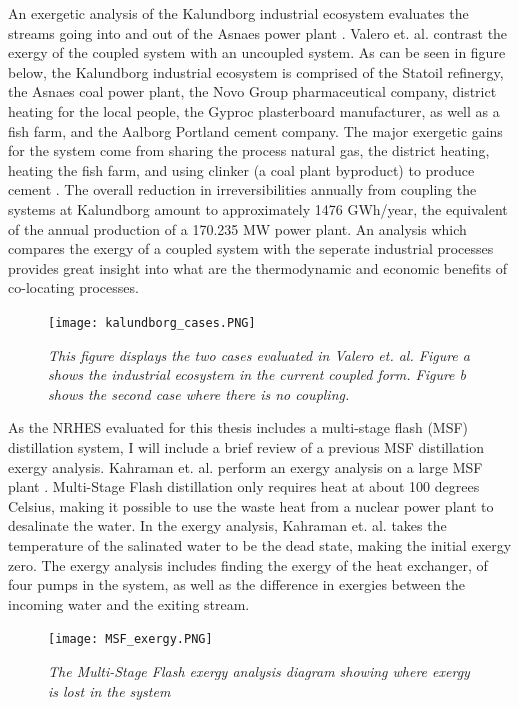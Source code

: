 \documentclass[12pt]{UIdahoMastersThesis}
\begin{document}
 An exergetic analysis of the Kalundborg industrial ecosystem evaluates the streams going into and out of the Asnaes power plant \cite{Valero2012}.  Valero et. al. contrast the exergy of the coupled system with an uncoupled system. As can be seen in figure below, the Kalundborg industrial ecosystem is comprised of the Statoil refinergy, the Asnaes coal power plant, the Novo Group pharmaceutical company, district heating for the local people, the Gyproc plasterboard manufacturer, as well as a fish farm, and  the Aalborg Portland cement company. The major exergetic gains for the system come from sharing the process natural gas, the district heating, heating the fish farm, and using clinker (a coal plant byproduct) to produce cement \cite{Valero2012}. The overall reduction in irreversibilities annually from coupling the systems at Kalundborg amount to approximately 1476 GWh/year, the equivalent of the annual production of a 170.235 MW power plant. An analysis which compares the exergy of a coupled system with the seperate industrial processes provides great insight into what are the thermodynamic and economic benefits of co-locating processes.
\begin{figure}
\texttt{[image: kalundborg\_cases.PNG]}
\caption{\small \sl This figure displays the two cases evaluated in Valero et. al. Figure a shows the industrial ecosystem in the current coupled form. Figure b shows the second case where there is no coupling.}
\end{figure}

As the NRHES evaluated for this thesis includes a multi-stage flash (MSF) distillation system, I will include a brief review of a previous MSF distillation exergy analysis. Kahraman et. al. perform an exergy analysis on a large MSF plant \cite{Kahraman2005}.  Multi-Stage Flash distillation only requires heat at about 100 degrees Celsius, making it possible to use the waste heat from a nuclear power plant to desalinate the water. In the exergy analysis, Kahraman et. al. takes the temperature of the salinated water to be the dead state, making the initial exergy zero. The exergy analysis includes finding the exergy of the heat exchanger, of four pumps in the system, as well as the difference in exergies between the incoming water and the exiting stream.

\begin{figure}
\texttt{[image: MSF\_exergy.PNG]}
\caption{\small \sl The Multi-Stage Flash exergy analysis diagram showing where exergy is lost in the system}
\end{figure}
\end{document}
